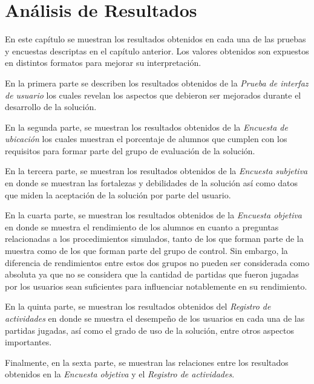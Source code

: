 \chapter{Análisis de Resultados}
\label{chap:analisis}


En este capítulo se muestran los resultados obtenidos en cada una de las pruebas 
y encuestas descriptas en el capítulo anterior. Los valores obtenidos son expuestos en
distintos formatos para mejorar su interpretación.

En la primera parte se describen los resultados obtenidos de la \emph{Prueba de interfaz de usuario} 
los cuales revelan los aspectos que debieron ser mejorados durante el desarrollo de 
la solución. 

En la segunda parte, se muestran los resultados obtenidos de la 
\emph{Encuesta de ubicación} los cuales muestran el porcentaje de alumnos que cumplen 
con los requisitos para formar parte del grupo de evaluación de la solución.

En la tercera parte, se muestran los resultados obtenidos de la \emph{Encuesta subjetiva} 
en donde se muestran las fortalezas y debilidades de la solución así como datos que miden 
la aceptación de la solución por parte del usuario. 

En la cuarta parte, se muestran los resultados obtenidos de la \emph{Encuesta objetiva} 
en donde se muestra el rendimiento de los alumnos en cuanto a preguntas relacionadas a 
los procedimientos simulados, tanto de los que forman parte de la muestra como de los que 
forman parte del grupo de control. Sin embargo, la diferencia de rendimientos entre 
estos dos grupos no pueden ser considerada como absoluta ya que no se considera que 
la cantidad de partidas que fueron jugadas por los usuarios sean suficientes para 
influenciar notablemente en su rendimiento.

En la quinta parte, se muestran los resultados obtenidos del \emph{Registro de actividades} 
en donde se muestra el desempeño de los usuarios en cada una de las partidas jugadas, así como 
el grado de uso de la solución, entre otros aspectos importantes.

Finalmente, en la sexta parte, se muestran las relaciones entre los resultados obtenidos en 
la \emph{Encuesta objetiva} y el \emph{Registro de actividades}.








%




